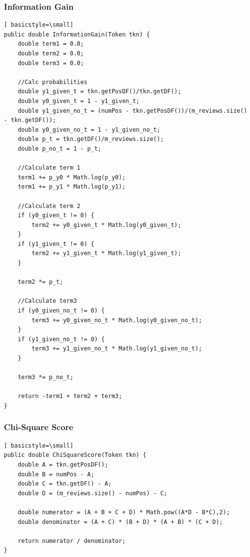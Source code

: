 \documentclass[paper=a4, fontsize=11pt]{jhwhw} %
\begin{document}
\subsubsection{Information Gain}
\begin{lstlisting}[ basicstyle=\small]
public double InformationGain(Token tkn) {
    double term1 = 0.0;
    double term2 = 0.0;
    double term3 = 0.0;

    //Calc probabilities
    double y1_given_t = tkn.getPosDF()/tkn.getDF();
    double y0_given_t = 1 - y1_given_t;
    double y1_given_no_t = (numPos - tkn.getPosDF())/(m_reviews.size() - tkn.getDF());
    double y0_given_no_t = 1 - y1_given_no_t;
    double p_t = tkn.getDF()/m_reviews.size();
    double p_no_t = 1 - p_t;

    //Calculate term 1
    term1 += p_y0 * Math.log(p_y0);
    term1 += p_y1 * Math.log(p_y1);

    //Calculate term 2
    if (y0_given_t != 0) {
        term2 += y0_given_t * Math.log(y0_given_t);
    }
    if (y1_given_t != 0) {
        term2 += y1_given_t * Math.log(y1_given_t);
    }

    term2 *= p_t;

    //Calculate term3
    if (y0_given_no_t != 0) {
        term3 += y0_given_no_t * Math.log(y0_given_no_t);
    }
    if (y1_given_no_t != 0) {
        term3 += y1_given_no_t * Math.log(y1_given_no_t);
    }

    term3 *= p_no_t;

    return -term1 + term2 + term3;
}
\end{lstlisting}

\subsubsection{Chi-Square Score}
\begin{lstlisting}[ basicstyle=\small]
public double ChiSquareScore(Token tkn) {
    double A = tkn.getPosDF();
    double B = numPos - A;
    double C = tkn.getDF() - A;
    double D = (m_reviews.size() - numPos) - C;

    double numerator = (A + B + C + D) * Math.pow((A*D - B*C),2);
    double denominator = (A + C) * (B + D) * (A + B) * (C + D);

    return numerator / denominator;
}

\end{lstlisting}
\end{document}
